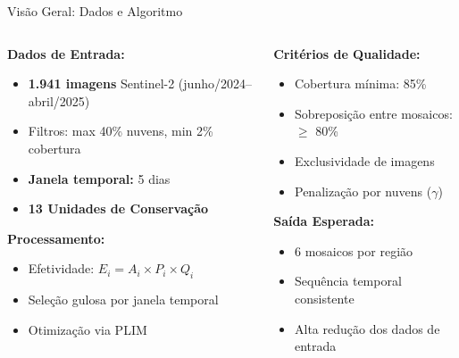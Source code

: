 \documentclass[aspectratio=169,11pt]{beamer}
\begin{document}
\begin{frame}{Visão Geral: Dados e Algoritmo}
\vspace{-0.4cm}

\begin{columns}[T]
    \begin{column}{0.48\textwidth}
        \textbf{\color{ufal}Dados de Entrada:}
        \begin{itemize}
            \item \textbf{1.941 imagens} Sentinel-2 (junho/2024--abril/2025)
            \item Filtros: max 40\% nuvens, min 2\% cobertura
            \item \textbf{Janela temporal:} 5 dias
            \item \textbf{13 Unidades de Conservação}
        \end{itemize}
        
        \vspace{0.3cm}
        \textbf{\color{success}Processamento:}
        \begin{itemize}
            \item Efetividade: $E_i = A_i \times P_i \times Q_i$
            \item Seleção gulosa por janela temporal
            \item Otimização via PLIM
        \end{itemize}
    \end{column}
    
    \begin{column}{0.48\textwidth}
        \textbf{\color{accent}Critérios de Qualidade:}
        \begin{itemize}
            \item Cobertura mínima: 85\%
            \item Sobreposição entre mosaicos: $\geq$ 80\%
            \item Exclusividade de imagens
            \item Penalização por nuvens ($\gamma$)
        \end{itemize}
        
        \vspace{0.3cm}
        \textbf{\color{ufal}Saída Esperada:}
        \begin{itemize}
            \item 6 mosaicos por região
            \item Sequência temporal consistente
            \item Alta redução dos dados de entrada
        \end{itemize}
    \end{column}
\end{columns}
\end{frame}
\end{document}
